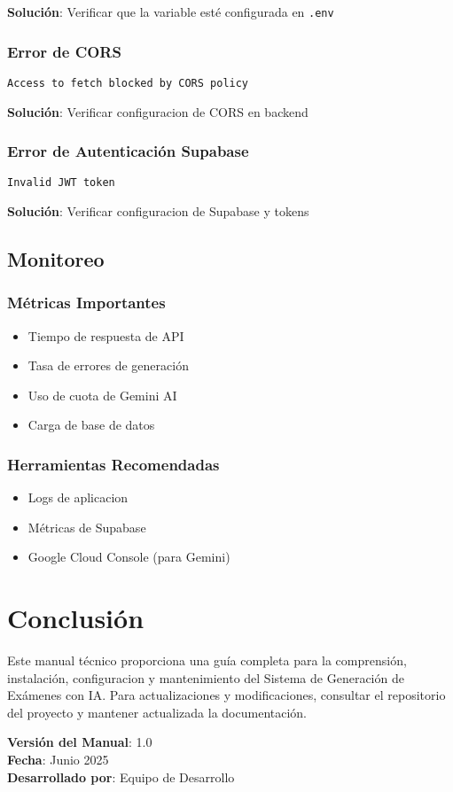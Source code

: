 \documentclass[12pt,a4paper]{report}
\begin{document}
\textbf{Solución}: Verificar que la variable esté configurada en \texttt{.env}

\subsection{Error de CORS}
\begin{lstlisting}
Access to fetch blocked by CORS policy
\end{lstlisting}

\textbf{Solución}: Verificar configuracion de CORS en backend

\subsection{Error de Autenticación Supabase}
\begin{lstlisting}
Invalid JWT token
\end{lstlisting}

\textbf{Solución}: Verificar configuracion de Supabase y tokens

\section{Monitoreo}

\subsection{Métricas Importantes}
\begin{itemize}
    \item Tiempo de respuesta de API
    \item Tasa de errores de generación
    \item Uso de cuota de Gemini AI
    \item Carga de base de datos
\end{itemize}

\subsection{Herramientas Recomendadas}
\begin{itemize}
    \item Logs de aplicacion
    \item Métricas de Supabase
    \item Google Cloud Console (para Gemini)
\end{itemize}

\chapter{Conclusión}

Este manual técnico proporciona una guía completa para la comprensión, instalación, configuracion y mantenimiento del Sistema de Generación de Exámenes con IA. Para actualizaciones y modificaciones, consultar el repositorio del proyecto y mantener actualizada la documentación.

\vspace{1cm}

\noindent\textbf{Versión del Manual}: 1.0\\
\textbf{Fecha}: Junio 2025\\
\textbf{Desarrollado por}: Equipo de Desarrollo
\end{document}
